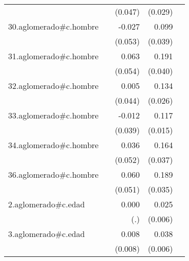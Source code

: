 {\begin{longtable}{l*{4}{D{.}{.}{-1}}}
            &                     &     (0.047)         &     (0.029)         &                     \\
\addlinespace
30.aglomerado#c.hombre&                     &      -0.027         &       0.099\sym{*}  &                     \\
            &                     &     (0.053)         &     (0.039)         &                     \\
\addlinespace
31.aglomerado#c.hombre&                     &       0.063         &       0.191\sym{***}&                     \\
            &                     &     (0.054)         &     (0.040)         &                     \\
\addlinespace
32.aglomerado#c.hombre&                     &       0.005         &       0.134\sym{***}&                     \\
            &                     &     (0.044)         &     (0.026)         &                     \\
\addlinespace
33.aglomerado#c.hombre&                     &      -0.012         &       0.117\sym{***}&                     \\
            &                     &     (0.039)         &     (0.015)         &                     \\
\addlinespace
34.aglomerado#c.hombre&                     &       0.036         &       0.164\sym{***}&                     \\
            &                     &     (0.052)         &     (0.037)         &                     \\
\addlinespace
36.aglomerado#c.hombre&                     &       0.060         &       0.189\sym{***}&                     \\
            &                     &     (0.051)         &     (0.035)         &                     \\
\addlinespace
2.aglomerado#c.edad&                     &       0.000         &       0.025\sym{***}&                     \\
            &                     &         (.)         &     (0.006)         &                     \\
\addlinespace
3.aglomerado#c.edad&                     &       0.008         &       0.038\sym{***}&                     \\
            &                     &     (0.008)         &     (0.006)         &                     \\

\end{longtable}}
